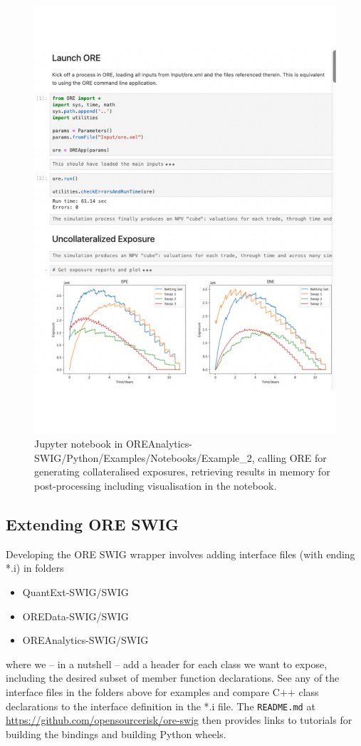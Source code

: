 \documentclass[12pt, a4paper]{report}
\begin{document}
\begin{figure}[h]
\begin{center}
\includegraphics[scale=0.8]{data/notebook.pdf}
\end{center}
\caption{Jupyter notebook in OREAnalytics-SWIG/Python/Examples/Notebooks/Example\_2,
  calling ORE for generating collateralised exposures, retrieving results in memory for post-processing
  including visualisation in the notebook.}
\label{fig:notebook}
\end{figure}
\clearpage

\subsection*{Extending ORE SWIG}

Developing the ORE SWIG wrapper involves adding interface files (with ending *.i) in folders
\begin{itemize}
\item QuantExt-SWIG/SWIG
\item OREData-SWIG/SWIG
\item OREAnalytics-SWIG/SWIG
\end{itemize}
where we -- in a nutshell -- add a header for each class we want to expose, including the desired
subset of member function declarations. See any of the interface files in the folders above for examples
and compare C++ class declarations to the interface definition in the *.i file.
The {\tt README.md} at \url{https://github.com/opensourcerisk/ore-swig} then provides links to
tutorials for building the bindings and building Python wheels.
\end{document}
